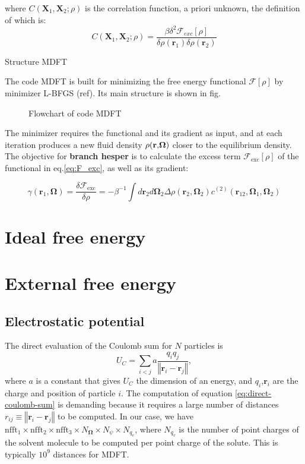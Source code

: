where $C(\mathbf{X}_{1},\mathbf{X}_{2};\rho)$ is the correlation
function, a priori unknown, the definition of which is: 
\[
C(\mathbf{X}_{1},\mathbf{X}_{2};\rho)=\frac{\beta\delta^{2}\mathcal{F}_{exc}[\rho]}{\delta\rho(\mathbf{r}_{1})\delta\rho(\mathbf{r}_{2})}
\]


Structure MDFT

The code MDFT is built for minimizing the free energy functional $\mathcal{F}[\rho]$
by minimizer L-BFGS (ref). Its main structure is shown in fig. 

\begin{figure}[h]
\caption{%
Flowchart of code MDFT%
}
\end{figure}


The minimizer requires the functional and its gradient as input, and
at each iteration produces a new fluid density $\text{\ensuremath{\rho}(\ensuremath{\mathbf{r}},\ensuremath{\mathbf{\mathbf{\mathbf{\Omega}}}})}$
closer to the equilibrium density. The objective for \textbf{branch
hesper} is to calculate the excess term $\mathcal{F}_{\mathrm{exc}}[\rho]$
of the functional in eq.\ref{eq:F_exc}, as well as its gradient: 

\begin{equation}
\gamma(\mathbf{r}_{1},\mathbf{\Omega})=\frac{\delta\mathcal{F}_{\mathrm{exc}}}{\delta\rho}=-\beta^{-1}\int d\mathbf{r}_{2}d\mathbf{\Omega}_{2}\Delta\rho(\mathbf{r}_{2},\mathbf{\Omega}_{2})c^{(2)}(\mathbf{r}_{12},\mathbf{\Omega}_{1},\mathbf{\Omega}_{2})\label{eq:gradient}
\end{equation}



\section{Ideal free energy}


\section{External free energy}


\subsection{Electrostatic potential}

The direct evaluation of the Coulomb sum for $N$ particles is 
\begin{equation}
U_{C}=\sum_{i<j}a\frac{q_{i}q_{j}}{\left\Vert \bm{r}_{i}-\bm{r}_{j}\right\Vert },\label{eq:direct-coulomb-sum}
\end{equation}
where $a$ is a constant that gives $U_{C}$ the dimension of an energy,
and $q_{i}$,$\bm{r}_{i}$ are the charge and position of particle
$i$. The computation of equation \ref{eq:direct-coulomb-sum} is
demanding because it requires a large number of distances $r_{ij}\equiv\left\Vert \bm{r}_{i}-\bm{r}_{j}\right\Vert $
to be computed. In our case, we have $\textrm{nfft}_{1}\times\textrm{nfft}_{2}\times\textrm{nfft}_{3}\times N_{\bm{\Omega}}\times N_{\psi}\times N_{q_{v}}$,
where $N_{q_{v}}$ is the number of point charges of the solvent molecule
to be computed per point charge of the solute. This is typically $10^{9}$
distances for MDFT.

